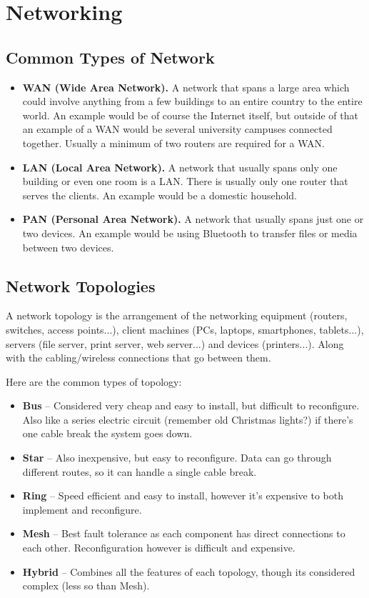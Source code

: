 \documentclass{article}
\begin{document}
\section{Networking}

\subsection{Common Types of Network}

\begin{itemize}
    \item \textbf{WAN (Wide Area Network).} A network that spans a large area which could involve anything from a few buildings to an entire country to the entire world. An example would be of course the Internet itself, but outside of that an example of a WAN would be several university campuses connected together. Usually a minimum of two routers are required for a WAN.
    \item \textbf{LAN (Local Area Network).} A network that usually spans only one building or even one room is a LAN. There is usually only one router that serves the clients. An example would be a domestic household.
    \item \textbf{PAN (Personal Area Network).} A network that usually spans just one or two devices. An example would be using Bluetooth to transfer files or media between two devices.
\end{itemize}

\subsection{Network Topologies}

A network topology is the arrangement of the networking equipment (routers, switches, access points...), client machines (PCs, laptops, smartphones, tablets...), servers (file server, print server, web server...) and devices (printers...). Along with the cabling/wireless connections that go between them.

Here are the common types of topology:
\begin{itemize}
    \item \textbf{Bus} -- Considered very cheap and easy to install, but difficult to reconfigure. Also like a series electric circuit (remember old Christmas lights?) if there's one cable break the system goes down.
    \item \textbf{Star} -- Also inexpensive, but easy to reconfigure. Data can go through different routes, so it can handle a single cable break. 
    \item \textbf{Ring} -- Speed efficient and easy to install, however it's expensive to both implement and reconfigure.
    \item \textbf{Mesh} -- Best fault tolerance as each component has direct connections to each other. Reconfiguration however is difficult and expensive.
    \item \textbf{Hybrid} -- Combines all the features of each topology, though its considered complex (less so than Mesh).
\end{itemize}
\end{document}
